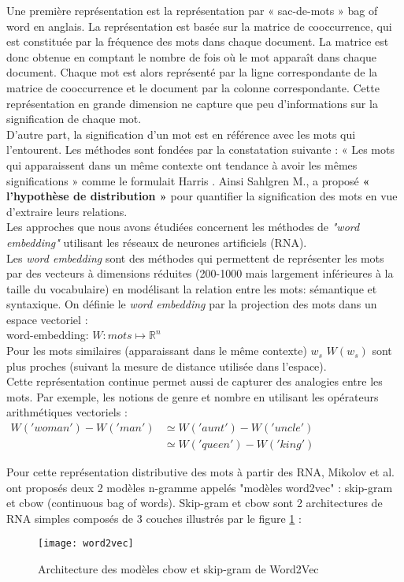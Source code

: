  Une première représentation est la représentation par « sac-de-mots » bag of word en anglais. La représentation est basée sur la matrice de cooccurrence, qui est constituée par la fréquence des mots dans chaque document. La matrice est donc obtenue en comptant le nombre de fois où le mot apparaît dans chaque document. Chaque mot est alors représenté par  la ligne correspondante de la matrice de cooccurrence et le document par la colonne correspondante. Cette représentation en grande dimension ne capture que peu d'informations sur la signification de chaque mot.\\
\smallskip
D'autre part, la signification d'un mot est en référence avec les mots qui l'entourent. Les méthodes sont fondées par la constatation suivante : « Les mots qui apparaissent dans un même contexte ont tendance à avoir les mêmes significations » comme le formulait Harris \cite{harris1954distributional}. Ainsi Sahlgren M., \cite{sahlgren2008distributional} a proposé \textbf{« l'hypothèse de distribution »} pour quantifier la signification des mots en vue d'extraire leurs relations.\\
Les approches que nous avons étudiées concernent les méthodes de \textit{"word embedding"} utilisant les réseaux de neurones artificiels (RNA).\\
Les \textit{word embedding} sont des méthodes qui permettent de représenter les mots par des vecteurs à dimensions réduites (200-1000 mais largement inférieures à la taille du vocabulaire) en modélisant la relation entre les mots: sémantique et syntaxique. On définie le \textit{word embedding} par la projection des mots dans un espace vectoriel :\\
word-embedding: $W: mots \mapsto \mathbb{R}^{n}$\\
Pour les mots similaires (apparaissant dans le même contexte) $w_{s}$  $W(w_{s})$ sont plus proches (suivant la mesure de distance utilisée dans l'espace).\\
Cette représentation continue permet aussi de capturer des analogies entre les mots. Par exemple, les notions de genre et nombre en utilisant les opérateurs arithmétiques vectoriels :\\
$\begin{matrix}
W('woman')- W('man') &\simeq  W('aunt')- W('uncle') \\
 & \simeq W('queen') - W('king')
\end{matrix}
$


 Pour cette représentation distributive des mots à partir des RNA, Mikolov et al.  \cite{mikolov2013efficient} ont proposés deux 2 modèles n-gramme appelés "modèles word2vec" : skip-gram et cbow (continuous bag of words). Skip-gram et cbow sont 2 architectures de RNA simples composés de 3 couches illustrés par le figure \ref{fig:wor2vec}  :\\
\medskip
\begin{figure}[h]
\label{fig:wor2vec}
	\begin{center}
		\texttt{[image: word2vec]}
		\caption{Architecture des modèles cbow et skip-gram de Word2Vec \cite{mikolov2013efficient}}
	\end{center}
\end{figure}


